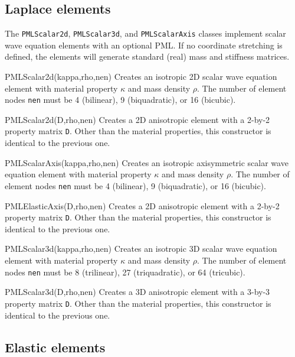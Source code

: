 \documentclass{article}
\newenvironment{codelist}[1][\quad]%
  {\begin{list}{}{%
   \settowidth{\labelwidth}{\texttt{#1}\hfil}%
   \setlength{\leftmargin}{\labelwidth}%
   \addtolength{\leftmargin}{\labelsep}%
   \addtolength{\leftmargin}{\parindent}%
   \renewcommand{\makelabel}[1]{\texttt{##1}}}}%
  {\end{list}}
\newcommand{\ttt}[1]{\texttt{#1}}
\begin{document}
\subsection{Laplace elements}

The \ttt{PMLScalar2d}, \ttt{PMLScalar3d}, and \ttt{PMLScalarAxis}
classes implement scalar wave equation elements with an optional PML.
If no coordinate stretching is defined, the elements will generate
standard (real) mass and stiffness matrices.
\begin{codelist}

  \item[PMLScalar2d(kappa,rho,nen)] 
    Creates an isotropic 2D scalar wave equation element with material
    property $\kappa$ and mass density $\rho$.  The number of element
    nodes \ttt{nen} must be 4 (bilinear), 9 (biquadratic), or 16
    (bicubic).

  \item[PMLScalar2d(D,rho,nen)]
    Creates a 2D anisotropic element with a 2-by-2 property matrix
    \ttt{D}.  Other than the material properties, this constructor is
    identical to the previous one.

  \item[PMLScalarAxis(kappa,rho,nen)]
    Creates an isotropic axisymmetric scalar wave equation element
    with material property $\kappa$ and mass density $\rho$.  The
    number of element nodes \ttt{nen} must be 4 (bilinear), 9
    (biquadratic), or 16 (bicubic).

  \item[PMLElasticAxis(D,rho,nen)]
    Creates a 2D anisotropic element with a 2-by-2 property matrix
    \ttt{D}.  Other than the material properties, this constructor is
    identical to the previous one.

  \item[PMLScalar3d(kappa,rho,nen)] 
    Creates an isotropic 3D scalar wave equation element with material
    property $\kappa$ and mass density $\rho$.  The number of element
    nodes \ttt{nen} must be 8 (trilinear), 27 (triquadratic), or 64
    (tricubic).

  \item[PMLScalar3d(D,rho,nen)]
    Creates a 3D anisotropic element with a 3-by-3 property matrix
    \ttt{D}.  Other than the material properties, this constructor is
    identical to the previous one.

\end{codelist}


\subsection{Elastic elements}
\end{document}
